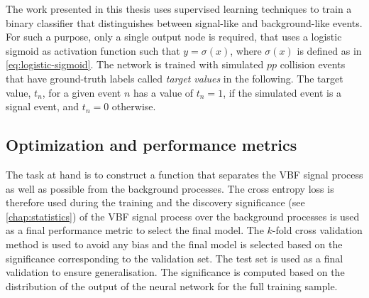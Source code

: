 The work presented in this thesis uses supervised learning techniques to train a binary classifier that distinguishes between signal-like and background-like events. 
For such a purpose, only a single output node is required, that uses a logistic sigmoid as activation function such that $y = \sigma(x)$, where $\sigma(x)$ is defined as in \cref{eq:logistic-sigmoid}.
The network is trained with simulated $pp$ collision events that have ground-truth labels called \emph{target values} in the following. The target value, $t_n$, for a given event $n$ has a value of $t_n = 1$, if the simulated event is a signal event, and $t_n = 0$ otherwise.


\subsection{Optimization and performance metrics}
The task at hand is to construct a function that separates the VBF signal process as well as possible from the background processes.
The cross entropy loss is therefore used during the training and the discovery significance (see \cref{chap:statistics}) of the VBF signal process over the background processes is used as a final performance metric to select the final model.
The $k$-fold cross validation method is used to avoid any bias and the final model is selected based on the significance corresponding to the validation set. 
The test set is used as a final validation to ensure generalisation. 
The significance is computed based on the distribution of the output of the neural network for the full training sample. 

